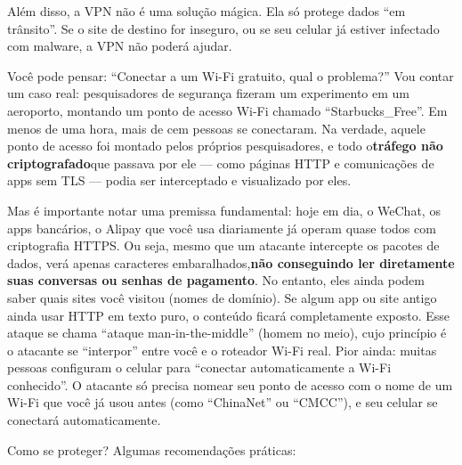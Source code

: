 Além disso, a VPN não é uma solução mágica. Ela só protege dados “em trânsito”. Se o site de destino for inseguro, ou se seu celular já estiver infectado com malware, a VPN não poderá ajudar.


Você pode pensar: “Conectar a um Wi-Fi gratuito, qual o problema?” Vou contar um caso real: pesquisadores de segurança fizeram um experimento em um aeroporto, montando um ponto de acesso Wi-Fi chamado “Starbucks\_Free”. Em menos de uma hora, mais de cem pessoas se conectaram. Na verdade, aquele ponto de acesso foi montado pelos próprios pesquisadores, e todo o\textbf{tráfego não criptografado}que passava por ele — como páginas HTTP e comunicações de apps sem TLS — podia ser interceptado e visualizado por eles.

Mas é importante notar uma premissa fundamental: hoje em dia, o WeChat, os apps bancários, o Alipay que você usa diariamente já operam quase todos com criptografia HTTPS. Ou seja, mesmo que um atacante intercepte os pacotes de dados, verá apenas caracteres embaralhados,\textbf{não conseguindo ler diretamente suas conversas ou senhas de pagamento}. No entanto, eles ainda podem saber quais sites você visitou (nomes de domínio). Se algum app ou site antigo ainda usar HTTP em texto puro, o conteúdo ficará completamente exposto. Esse ataque se chama “ataque man-in-the-middle” (homem no meio), cujo princípio é o atacante se “interpor” entre você e o roteador Wi-Fi real. Pior ainda: muitas pessoas configuram o celular para “conectar automaticamente a Wi-Fi conhecido”. O atacante só precisa nomear seu ponto de acesso com o nome de um Wi-Fi que você já usou antes (como “ChinaNet” ou “CMCC”), e seu celular se conectará automaticamente.

Como se proteger? Algumas recomendações práticas:


